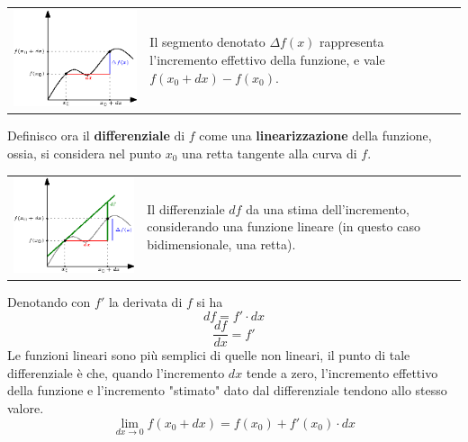 \documentclass[10pt, letterpaper]{report}
\begin{document}
\begin{center}
	\begin{tabular}{>{\centering\arraybackslash}m{3in}>{\centering\arraybackslash}m{3in}}
		\includegraphics[width=.8\linewidth]{images/differenziale1.eps} & Il segmento denotato \color{blue}$\Delta f(x)$ \color{black} rappresenta l'incremento 
        effettivo della funzione, e vale $f(x_0+d x)-f(x_0)$.
		\\
	\end{tabular}
\end{center}
Definisco ora il \textbf{differenziale} 
di $f$ come una  \textbf{linearizzazione} della funzione, ossia, si considera nel punto $x_0$ una 
retta tangente alla curva di $f$.
\begin{center}
	\begin{tabular}{>{\centering\arraybackslash}m{3in}>{\centering\arraybackslash}m{3in}}
		\includegraphics[width=.8\linewidth]{images/differenziale2.eps} &Il differenziale \color{darkgreen} $df$ \color{black}da una stima dell'incremento, considerando una funzione lineare (in questo 
        caso bidimensionale, una retta).
		\\
	\end{tabular}
\end{center}
Denotando con $f'$ la derivata di $f$ si ha
$$ df=f'\cdot dx$$
$$ \frac{df}{dx}=f'$$
Le funzioni lineari sono più semplici di quelle non lineari, il punto di tale differenziale 
è che, quando l'incremento $d x$ tende a zero, l'incremento effettivo della funzione 
e l'incremento "stimato" dato dal differenziale tendono allo stesso valore. $$ 
\lim_{d x\rightarrow 0 }f(x_0+dx)=f(x_0)+f'(x_0)\cdot dx
$$
\end{document}
